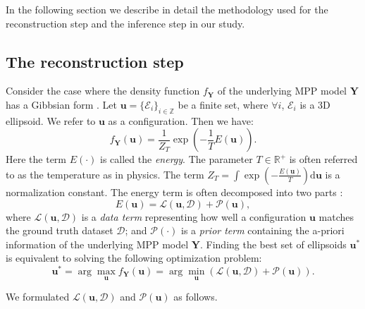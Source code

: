 \documentclass[journal]{IEEEtran}
\newcommand{\dd}[1]{\mathrm{d}#1}%
\begin{document}
In the following section we describe in detail the methodology used
for the reconstruction step and the inference step in our study.

\subsection{The reconstruction step}
\label{sec:reconstr-step:-appr}

Consider the case where the density function $f_{\mathbf{Y}}$ of the
underlying MPP model $\mathbf{Y}$ has a Gibbsian form
\cite{moller2007modern}. Let
$\mathbf{u} = \{ \mathcal{E}_i\}_{i \in \mathbb{Z}}$ be a finite set,
where $\forall i$, $\mathcal{E}_i$ is a 3D ellipsoid. We refer to
$\mathbf{u}$ as a configuration. Then we have:
\begin{equation}
  \label{eq:gibbs-density}
  f_{\mathbf{Y}}(\mathbf{u}) = \frac{1}{Z_T} \exp \left( - \frac{1}{T}
    E(\mathbf{u}) \right).
\end{equation}
Here the term $E(\cdot)$ is called the \textit{energy}. The parameter
$T \in \mathbb{R}^{+}$ is often referred to as the temperature as in
physics. The term
$Z_T = \int \exp \left( - \frac{E(\mathbf{u})}{T} \right) \dd
\mathbf{u}$ is a normalization constant. The energy term is often
decomposed into two parts \cite{lafarge2010geometric}
\cite{descombes2009object}:
\begin{equation}
  \label{mpp-energy}
  E(\mathbf{u}) = \mathcal{L}(\mathbf{u}, \mathcal{D})
  + \mathcal{P} (\mathbf{u}),
\end{equation}
where $\mathcal{L}(\mathbf{u}, \mathcal{D})$ is a \textit {data term}
representing how well a configuration $\mathbf{u}$ matches the ground
truth dataset $\mathcal{D}$; and $\mathcal{P} (\cdot)$ is a \textit
{prior term} containing the a-priori information of the underlying MPP
model $\mathbf{Y}$. Finding the best set of ellipsoids
$\mathbf{u}^{*}$ is equivalent to solving the following optimization
problem:
\begin{equation}
  \label{mpp-opt-energy}
  \mathbf{u}^{*}
  = \arg \max_{\mathbf{u}}{f_{\mathbf{Y}}(\mathbf{u})}
  = \arg\min_ {\mathbf{u}} \left( \mathcal{L}(\mathbf{u},
    \mathcal{D}) + \mathcal{P} (\mathbf{u}) \right).
\end{equation}

We formulated $\mathcal{L}(\mathbf{u}, \mathcal{D})$ and
$\mathcal{P} (\mathbf{u})$ as follows.
\end{document}
